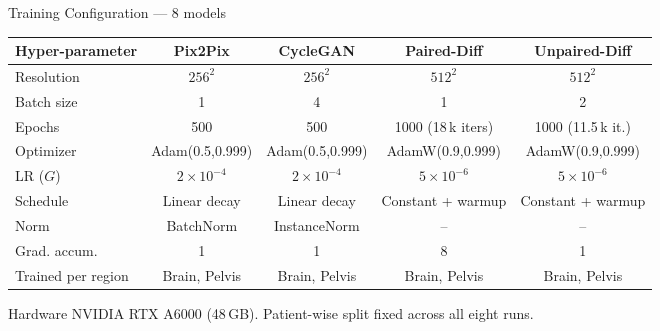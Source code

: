 \documentclass[aspectratio=169,10pt]{beamer}
\begin{document}
\begin{frame}{Training Configuration --- 8 models}
\centering
\footnotesize
\renewcommand{\arraystretch}{1.1}
\begin{tabular}{lcccc}
\toprule
\textbf{Hyper-parameter} & \textbf{Pix2Pix} & \textbf{CycleGAN} & \textbf{Paired-Diff} & \textbf{Unpaired-Diff} \\\midrule
Resolution                 & $256^{2}$            & $256^{2}$            & $512^{2}$           & $512^{2}$           \\
Batch size                 & 1                    & 4                    & 1                   & 2                   \\
Epochs                     & 500                  & 500                  & 1000 (18\,k iters)  & 1000 (11.5\,k it.)  \\
Optimizer                  & Adam(0.5,0.999)      & Adam(0.5,0.999)      & AdamW(0.9,0.999)    & AdamW(0.9,0.999)    \\
LR ($G$)                   & $2{\times}10^{-4}$   & $2{\times}10^{-4}$   & $5{\times}10^{-6}$  & $5{\times}10^{-6}$  \\
Schedule                   & Linear decay         & Linear decay         & Constant + warmup   & Constant + warmup   \\
Norm                       & BatchNorm            & InstanceNorm         & --                  & --                  \\
Grad. accum.               & 1                    & 1                    & 8                   & 1                   \\
Trained per region         & Brain, Pelvis        & Brain, Pelvis        & Brain, Pelvis       & Brain, Pelvis       \\
\bottomrule
\end{tabular}
\vspace{1mm}
\begin{alertblock}{Hardware}
\scriptsize NVIDIA RTX A6000 (48\,GB). Patient-wise split fixed across all eight runs.
\end{alertblock}
\end{frame}


\end{document}
